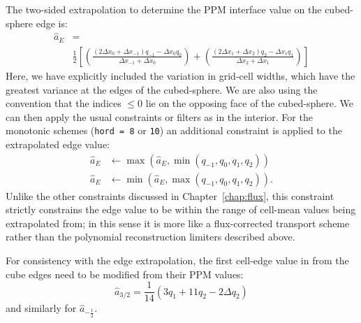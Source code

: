 \documentclass[10pt,letterpaper,margin=1in]{memoir}
\newcommand{\half}{\frac{1}{2}}
\begin{document}
The two-sided extrapolation to determine the PPM interface value on the cubed-sphere edge is:
\begin{subequations}
  \begin{align}
    \widehat{a}_E &= \\
& \frac{1}{2} \left [ \left ( \frac{ \left ( 2\Delta x_0 + \Delta x_{-1} \right )q_{-1} - \Delta x_{0}q_0 }{\Delta x_{-1} + \Delta x_0} \right )  + 
  \left ( \frac{ \left ( 2\Delta x_1 + \Delta x_{2} \right )q_{2} - \Delta x_{1}q_1 }{\Delta x_{2} + \Delta x_1} \right ) \right ] 
  \end{align}
\end{subequations}
Here, we have explicitly included the variation in grid-cell widths, which have the greatest variance at the edges of the cubed-sphere. We are also using the convention that the indices $\le 0$ lie on the opposing  face of the cubed-sphere. We can then apply the usual constraints or filters as in the interior. For the monotonic schemes (\texttt{hord = 8} or \texttt{10}) an additional constraint is applied to the extrapolated edge value:
\begin{equation}
\begin{split}
\widehat{a}_E  & \leftarrow \max \left (\widehat{a}_E, \min \left (q_{-1}, q_0, q_1, q_2 \right ) \right ) \\
\widehat{a}_E  & \leftarrow \min \left (\widehat{a}_E, \max \left (q_{-1}, q_0, q_1, q_2 \right ) \right ).
\end{split}
\end{equation}
Unlike the other constraints discussed in Chapter~\ref{chap:flux}, this constraint strictly constrains the edge value to be within the range of cell-mean values being extrapolated from; in this sense it is more like a flux-corrected transport scheme rather than the polynomial reconstruction limiters described above.

For consistency with the edge extrapolation, the first cell-edge value in from the cube edges need to be modified from their PPM values:
\begin{equation}
\widehat{a}_{3/2} = \frac{1}{14} \left ( 3  q_1 + 11 q_2  - 2 \Delta q_2 \right ) 
\end{equation}
and similarly for $\widehat{a}_{-\half}$. 

\end{document}
